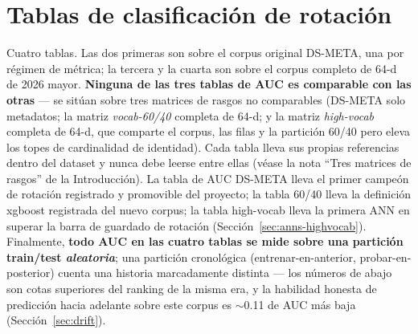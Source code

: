 \documentclass[11pt]{article}
\begin{document}
\section{Tablas de clasificación de rotación}
\label{sec:leaderboard}
Cuatro tablas. Las dos primeras son sobre el corpus original DS-META, una por
régimen de métrica; la tercera y la cuarta son sobre el corpus completo de 64-d
de 2026 mayor. \textbf{Ninguna de las tres tablas de AUC es comparable con las
otras} --- se sitúan sobre tres matrices de rasgos no comparables (DS-META solo
metadatos; la matriz \emph{vocab-60/40} completa de 64-d; y la matriz
\emph{high-vocab} completa de 64-d, que comparte el corpus, las filas y la
partición 60/40 pero eleva los topes de cardinalidad de identidad). Cada tabla
lleva sus propias referencias dentro del dataset y nunca debe leerse entre ellas
(véase la nota ``Tres matrices de rasgos'' de la Introducción). La tabla de AUC
DS-META lleva el primer campeón de rotación registrado y promovible del proyecto;
la tabla 60/40 lleva la definición xgboost registrada del nuevo corpus; la tabla
high-vocab lleva la primera ANN en superar la barra de guardado de rotación
(Sección~\ref{sec:anns-highvocab}). Finalmente, \textbf{todo AUC en las cuatro
tablas se mide sobre una partición train/test \emph{aleatoria}}; una partición
cronológica (entrenar-en-anterior, probar-en-posterior) cuenta una historia
marcadamente distinta --- los números de abajo son cotas superiores del ranking
de la misma era, y la habilidad honesta de predicción hacia adelante sobre este
corpus es $\sim$0.11 de AUC más baja (Sección~\ref{sec:drift}).
\end{document}

